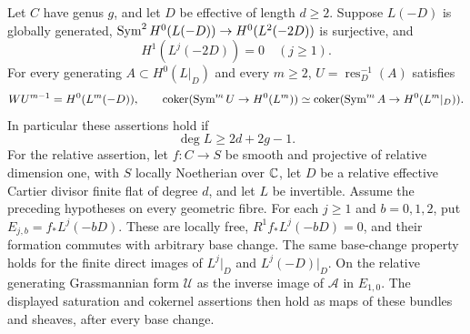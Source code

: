 \begin{theorem}\label{thm:curve-conductor}
Let $C$ have genus $g$, and let $D$ be effective of length $d\ge2$.
Suppose $L(-D)$ is globally generated,
$\operatorname{Sym}^2H^0(L(-D))\to H^0(L^2(-2D))$ is surjective, and
\begin{equation}\label{eq:curve-vanishing}
 H^1(L^j(-2D))=0\quad(j\ge1).
\end{equation}
For every generating $A\subset H^0(L|_D)$ and every $m\ge2$,
$U=\operatorname{res}_D^{-1}(A)$ satisfies
\[
 WU^{m-1}=H^0(L^m(-D)),\qquad
 \operatorname{coker}(\operatorname{Sym}^mU\to H^0(L^m))
 \simeq\operatorname{coker}(\operatorname{Sym}^mA\to H^0(L^m|_D)).
\]
In particular these assertions hold if
\begin{equation}\label{eq:curve-numerical}
 \deg L\ge2d+2g-1.
\end{equation}
For the relative assertion, let $f:C\to S$ be smooth and projective
of relative dimension one, with $S$ locally Noetherian over $\mathbb C$,
let $D$ be a relative effective Cartier divisor finite flat of degree
$d$, and let $L$ be invertible. Assume the preceding hypotheses on
every geometric fibre. For each $j\ge1$ and $b=0,1,2$, put
$E_{j,b}=f_*L^j(-bD)$. These are locally free, $R^1f_*L^j(-bD)=0$,
and their formation commutes with arbitrary base change. The same
base-change property holds for the finite direct images of
$L^j|_D$ and $L^j(-D)|_D$. On the relative generating Grassmannian
form $\mathcal U$ as the inverse image of $\mathcal A$ in $E_{1,0}$.
The displayed saturation and cokernel assertions then hold as maps
of these bundles and sheaves, after every base change.
\end{theorem}
